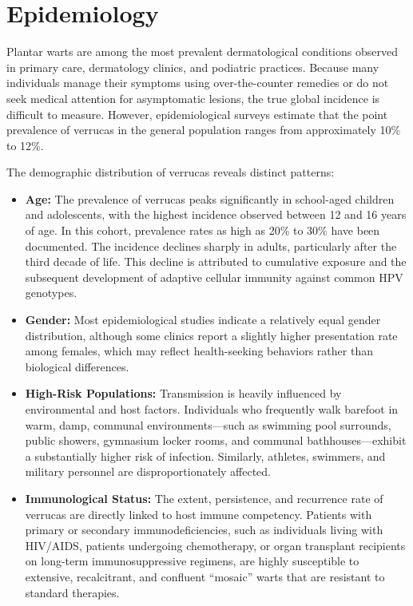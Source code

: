 \section*{Epidemiology}
Plantar warts are among the most prevalent dermatological conditions observed in primary care, dermatology clinics, and podiatric practices. Because many individuals manage their symptoms using over-the-counter remedies or do not seek medical attention for asymptomatic lesions, the true global incidence is difficult to measure. However, epidemiological surveys estimate that the point prevalence of verrucas in the general population ranges from approximately 10\% to 12\%.

The demographic distribution of verrucas reveals distinct patterns:
\begin{itemize}
    \item \textbf{Age:} The prevalence of verrucas peaks significantly in school-aged children and adolescents, with the highest incidence observed between 12 and 16 years of age. In this cohort, prevalence rates as high as 20\% to 30\% have been documented. The incidence declines sharply in adults, particularly after the third decade of life. This decline is attributed to cumulative exposure and the subsequent development of adaptive cellular immunity against common HPV genotypes.
    \item \textbf{Gender:} Most epidemiological studies indicate a relatively equal gender distribution, although some clinics report a slightly higher presentation rate among females, which may reflect health-seeking behaviors rather than biological differences.
    \item \textbf{High-Risk Populations:} Transmission is heavily influenced by environmental and host factors. Individuals who frequently walk barefoot in warm, damp, communal environments—such as swimming pool surrounds, public showers, gymnasium locker rooms, and communal bathhouses—exhibit a substantially higher risk of infection. Similarly, athletes, swimmers, and military personnel are disproportionately affected.
    \item \textbf{Immunological Status:} The extent, persistence, and recurrence rate of verrucas are directly linked to host immune competency. Patients with primary or secondary immunodeficiencies, such as individuals living with HIV/AIDS, patients undergoing chemotherapy, or organ transplant recipients on long-term immunosuppressive regimens, are highly susceptible to extensive, recalcitrant, and confluent ``mosaic'' warts that are resistant to standard therapies.
\end{itemize}

